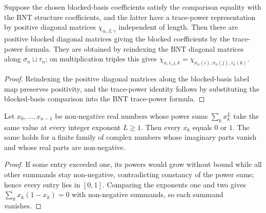 \begin{lemma}%
    \label{thm:mpdo_bnt_blocked_basis_to_positive_blocked_chi_trace_power_form}
    \leanok
    Suppose the chosen blocked-basis coefficients satisfy the comparison
    equality with the BNT structure coefficients, and the latter have a
    trace-power representation by positive diagonal matrices
    $\chi_{\alpha,\beta,\gamma}$ independent of length. Then there are
    positive blocked diagonal matrices giving the blocked coefficients by
    the trace-power formula.
    They are obtained by reindexing the BNT diagonal matrices along
    $\sigma_n\sqcup\tau_n$; on multiplication triples this gives
    $\chi_{n,i,j,k}=\chi_{\sigma_n(i),\sigma_n(j),\tau_n(k)}$.
\end{lemma}
\begin{proof}\leanok
    Reindexing the positive diagonal matrices along the blocked-basis
    label map preserves positivity, and the trace-power
    identity follows by substituting the blocked-basis comparison into the
    BNT trace-power formula.
\end{proof}

\begin{lemma}%
    \label{lem:constant_power_sum_dichotomy}
    \leanok
    Let $x_0,\ldots,x_{n-1}$ be non-negative real numbers whose power sums
    $\sum_k x_k^L$ take the same value at every integer exponent $L \ge 1$.
    Then every $x_k$ equals $0$ or $1$. The same holds for a finite family of
    complex numbers whose imaginary parts vanish and whose real parts are
    non-negative.
\end{lemma}
\begin{proof}\leanok
    If some entry exceeded one, its powers would grow without bound while
    all other summands stay non-negative, contradicting constancy of the
    power sums; hence every entry lies in $[0,1]$. Comparing the exponents
    one and two gives $\sum_k x_k(1-x_k) = 0$ with non-negative summands, so
    each summand vanishes.
\end{proof}

